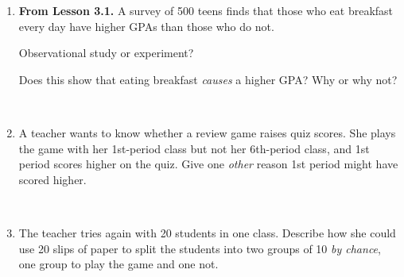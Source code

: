 \documentclass[12pt]{article}
\begin{document}

\vspace{0.28in}

\begin{enumerate}[leftmargin=1.9em, itemsep=0.42in]

  \item \textbf{From Lesson 3.1.} A survey of 500 teens finds that those who eat breakfast
        every day have higher GPAs than those who do not.

        \vspace{12pt}
        Observational study or experiment? \blank{4.2cm}
        \vspace{16pt}

        Does this show that eating breakfast \emph{causes} a higher GPA? Why or why not?
        \vspace{12pt}

        \writeline\\[18pt]\writeline

  \item A teacher wants to know whether a review game raises quiz scores. She plays the game
        with her 1st-period class but not her 6th-period class, and 1st period scores higher on
        the quiz. Give one \emph{other} reason 1st period might have scored higher.

        \vspace{12pt}
        \writeline\\[18pt]\writeline

  \item The teacher tries again with 20 students in one class. Describe how she could use 20
        slips of paper to split the students into two groups of 10 \emph{by chance}, one group
        to play the game and one not.

        \vspace{12pt}
        \writeline\\[18pt]\writeline\\[18pt]\writeline

\end{enumerate}
\end{document}

